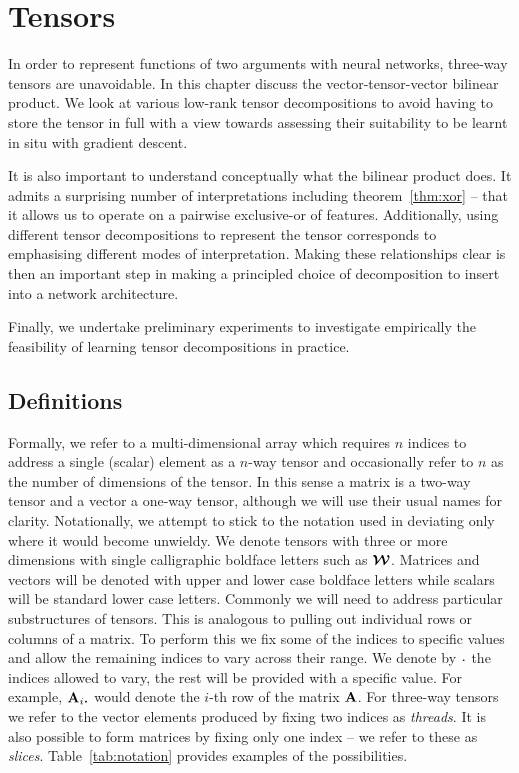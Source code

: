 
\chapter{Tensors}\label{C:tens}

In order to represent functions of two arguments with neural networks, three-way tensors are 
unavoidable. In this chapter discuss the vector-tensor-vector bilinear product. We look at various
low-rank tensor decompositions to avoid having to store the tensor in full with a view towards
assessing their suitability to be learnt in situ with gradient descent.

It is also important to understand conceptually what the bilinear product does. It admits a surprising
number of interpretations including theorem~\ref{thm:xor} -- that it allows us to operate on a
pairwise exclusive-or of features. Additionally, using different tensor decompositions to represent
the tensor corresponds to emphasising different modes of interpretation. Making these relationships
clear is then an important step in making a principled choice of decomposition to insert into a 
network architecture.

Finally, we undertake preliminary experiments to investigate empirically the feasibility of learning
tensor decompositions in practice.

\section{Definitions}
Formally, we refer to a multi-dimensional array which requires \(n\) indices to address a single
(scalar) element as a \(n\)-way tensor and occasionally refer to \(n\) as the number of dimensions of
the tensor. In this sense a matrix is a two-way tensor and a vector
a one-way tensor, although we will use their usual names for clarity. Notationally, we attempt to
stick to the notation used in \autocite{Kolda2009} deviating only where it would become unwieldy.
We denote tensors with three or more dimensions with single calligraphic boldface letters such
as \(\bm{\mathcal{W}}\). Matrices and vectors will be denoted with upper and lower case boldface letters
while scalars will be standard lower case letters. Commonly we will need to address particular
substructures of tensors. This is analogous to pulling out individual rows or columns of a matrix.
To perform this we fix some of the indices to specific values and allow the remaining indices to vary
across their range. We denote by \(\midbullet\) the indices allowed to vary, the rest will be provided
with a specific value. For example, \(\mat{A}_{i \midbullet}\) would denote the \(i\)-th row of the
matrix \(\mathbf{A}\).
For three-way tensors we refer to the vector elements produced by fixing two indices as 
\emph{threads}. It is also possible to form matrices by fixing only one index -- we refer to these
as \emph{slices}. Table~\ref{tab:notation} provides examples of the possibilities.

